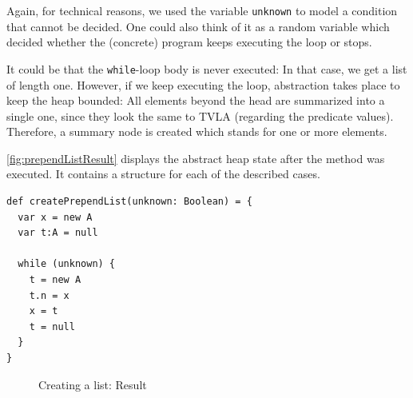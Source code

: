 \documentclass[11pt,a4paper,english]{article}
\begin{document}
Again, for technical reasons, we used the variable \texttt{unknown} to model a
condition that cannot be decided. One could also think of it as a random
variable which decided whether the (concrete) program keeps executing the loop
or stops.

It could be that the \texttt{while}-loop body is never executed: In that case, we get
a list of length one. However, if we keep executing the loop, abstraction takes
place to keep the heap bounded: All elements beyond the head are summarized into
a single one, since they look the same to TVLA (regarding the predicate values).
Therefore, a summary node is created which stands for one or more elements.

\autoref{fig:prependListResult} displays the abstract heap state after the
method was executed. It contains a structure for each of the described cases.

\begin{lstlisting}[float,caption={List creation},label={lst:createPrependList}]
def createPrependList(unknown: Boolean) = {
  var x = new A
  var t:A = null

  while (unknown) {
  	t = new A
  	t.n = x
   	x = t
	t = null
  }
}
\end{lstlisting}

\begin{figure}
  \begin{center}
  \begin{lrbox}{\mygraphboxA}
\end{lrbox}
\begin{lrbox}{\mygraphboxB}
\end{lrbox}

\subfloat[Structure 1]{\hspace{1cm}\usebox{\mygraphboxA}\hspace{1cm}}
  \hspace{3cm}
  \subfloat[Structure 2]{\usebox{\mygraphboxB}}
  

  \end{center}
  \caption{Creating a list: Result}
  \label{fig:prependListResult}
\end{figure}
\end{document}
